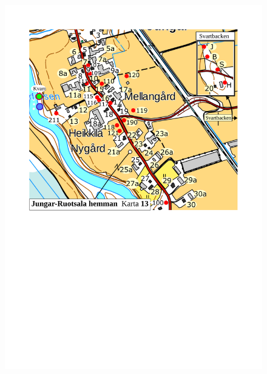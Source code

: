 \begin{figure}[htbp]
  \centering
  \includegraphics[width=1\textwidth]{kartor/Karta13.pdf}
  \label{map:13}
\end{figure}

